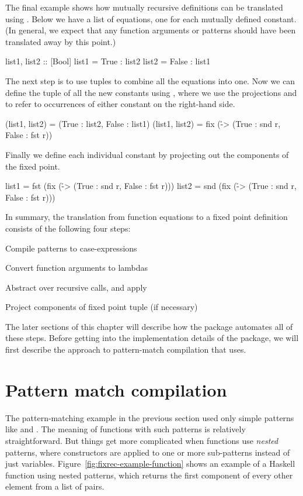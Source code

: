 %
The final example shows how mutually recursive definitions can be translated using . Below we have a list of equations, one for each mutually defined constant. (In general, we expect that any function arguments or patterns should have been translated away by this point.)
%
\begin{hscode}
list1, list2 :: [Bool]
list1 = True : list2
list2 = False : list1
\end{hscode}
%
The next step is to use tuples to combine all the equations into one. Now we can define the tuple of all the new constants using , where we use the projections  and  to refer to occurrences of either constant on the right-hand side.
%
\begin{hscode}
(list1, list2) = (True : list2, False : list1)
(list1, list2) = fix (\r -> (True : snd r, False : fst r))
\end{hscode}
%
Finally we define each individual constant by projecting out the components of the fixed point.
%
\begin{hscode}
list1 = fst (fix (\r -> (True : snd r, False : fst r)))
list2 = snd (fix (\r -> (True : snd r, False : fst r)))
\end{hscode}
%
In summary, the translation from function equations to a fixed point definition consists of the following four steps:
%
\begin{enumerate*}
\item Compile patterns to case-expressions
\item Convert function arguments to lambdas
\item Abstract over recursive calls, and apply 
\item Project components of fixed point tuple (if necessary)
\end{enumerate*}
%
The later sections of this chapter will describe how the {\fixrec} package automates all of these steps. Before getting into the implementation details of the package, we will first describe the approach to pattern-match compilation that {\fixrec} uses.

\section{Pattern match compilation}
\label{sec:fixrec-match}

The pattern-matching example in the previous section used only simple patterns like \hs{[]} and . The meaning of functions with such patterns is relatively straightforward. But things get more complicated when functions use \emph{nested} patterns, where constructors are applied to one or more sub-patterns instead of just variables. Figure~\ref{fig:fixrec-example-function} shows an example of a Haskell function using nested patterns, which returns the first component of every other element from a list of pairs.


